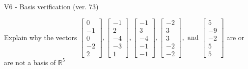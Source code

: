 \begin{exercise}
  \begin{exerciseTitle}V6 - Basis verification (ver. 73)\end{exerciseTitle}
  \begin{exerciseStatement}
    Explain why the vectors \(\left[\begin{array}{r}
0 \\
-1 \\
0 \\
-2 \\
2
\end{array}\right] , \left[\begin{array}{r}
-1 \\
2 \\
-4 \\
-3 \\
1
\end{array}\right] , \left[\begin{array}{r}
-1 \\
3 \\
-4 \\
-1 \\
-1
\end{array}\right] , \left[\begin{array}{r}
-2 \\
3 \\
3 \\
-2 \\
-2
\end{array}\right] , \text{ and } \left[\begin{array}{r}
5 \\
-9 \\
-2 \\
5 \\
5
\end{array}\right]\) are or are not a basis of \(\mathbb{R}^5\)	



\end{exerciseStatement}
\end{exercise}
